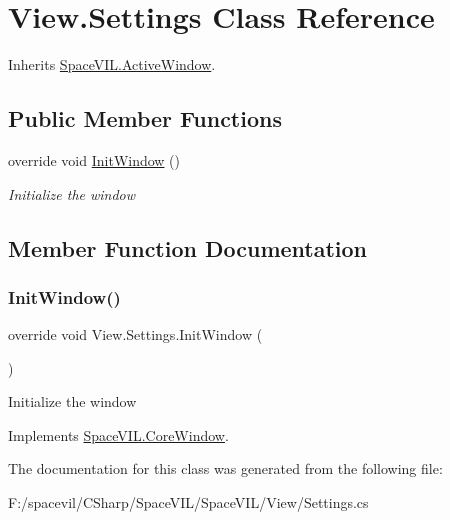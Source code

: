 \hypertarget{class_view_1_1_settings}{}\section{View.\+Settings Class Reference}
\label{class_view_1_1_settings}


Inherits \mbox{\hyperlink{class_space_v_i_l_1_1_active_window}{Space\+V\+I\+L.\+Active\+Window}}.

\subsection*{Public Member Functions}
\begin{DoxyCompactItemize}
\item 
override void \mbox{\hyperlink{class_view_1_1_settings_a14740ebfdf1f004feb4b7248bf3e567a}{Init\+Window}} ()
\begin{DoxyCompactList}\small\item\em Initialize the window \end{DoxyCompactList}\end{DoxyCompactItemize}


\subsection{Member Function Documentation}
\mbox{\label{class_view_1_1_settings_a14740ebfdf1f004feb4b7248bf3e567a}} 
\subsubsection{\texorpdfstring{Init\+Window()}{InitWindow()}}
{\footnotesize\ttfamily override void View.\+Settings.\+Init\+Window (\begin{DoxyParamCaption}{ }\end{DoxyParamCaption})\hspace{0.3cm}{\ttfamily [virtual]}}



Initialize the window 



Implements \mbox{\hyperlink{class_space_v_i_l_1_1_core_window_aa3cf4ac54d9651b1149584dc81042824}{Space\+V\+I\+L.\+Core\+Window}}.



The documentation for this class was generated from the following file\+:\begin{DoxyCompactItemize}
\item 
F\+:/spacevil/\+C\+Sharp/\+Space\+V\+I\+L/\+Space\+V\+I\+L/\+View/Settings.\+cs\end{DoxyCompactItemize}

